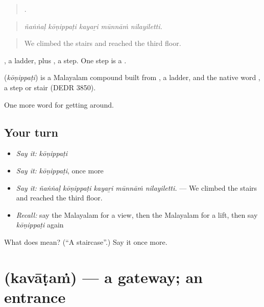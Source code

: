 \begin{quote}
    .
\end{quote}

\begin{quote}
\emph{ñaṅṅaḷ kōṇippaṭi kayaṟi mūnnāṁ nilayiletti.}
\end{quote}

\begin{quote}
We climbed the stairs and reached the third floor.
\end{quote}

, a ladder, plus , a step. One step is a .

\begin{cousinweb}
\textbf{} (\emph{kōṇippaṭi}) is a Malayalam compound built from , a ladder, and the native word , a step or stair (DEDR 3850).
\end{cousinweb}

\begin{grammarlens}[title={What you've built}]
One more word for getting around.
\end{grammarlens}

\subsection*{Your turn}
\begin{itemize}
\raggedright
  \item \emph{Say it:} \emph{kōṇippaṭi}
  \item \emph{Say it:} \emph{kōṇippaṭi}, once more
  \item \emph{Say it:} \emph{ñaṅṅaḷ kōṇippaṭi kayaṟi mūnnāṁ nilayiletti.} — We climbed the stairs and reached the third floor.
  \item \emph{Recall:} say the Malayalam for a view, then the Malayalam for a lift, then say \emph{kōṇippaṭi} again
\end{itemize}

\begin{tcolorbox}[breakable,colback=teal!4,colframe=teal!35!black,title={Before you move on}]
What does  mean? (\textquotedblleft{}A staircase\textquotedblright{}.) Say it once more.
\end{tcolorbox}
\section[\texorpdfstring{\ml{കവാടം} (kavāṭaṁ)}{കവാടം (kavāṭaṁ)}]{ (kavāṭaṁ) — a gateway; an entrance}

